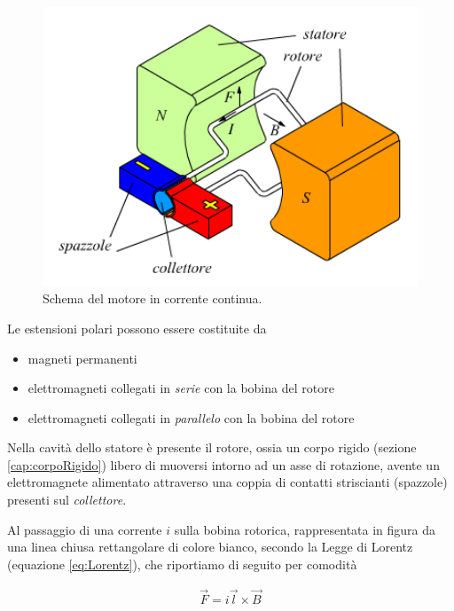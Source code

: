 \documentclass[17pt]{extarticle}
\begin{document}
 \begin{figure}[bh!]		
	\centering
   	\includegraphics[width=4.8in]{motoreCorrenteContinua.png}
  	\caption{Schema del motore in corrente continua.}
   	\label{fig:motoreCorrenteContinua}
\end{figure}


Le estensioni polari possono essere costituite da
\begin{itemize}
	\item magneti permanenti 
	\item elettromagneti collegati in \emph{serie} con la bobina del rotore
	\item elettromagneti collegati in \emph{parallelo} con la bobina del rotore
\end{itemize} 
Nella cavità dello statore è presente il rotore, ossia un corpo rigido (sezione \ref{cap:corpoRigido}) libero di muoversi intorno ad un asse di rotazione, avente un elettromagnete alimentato attraverso una coppia di contatti striscianti (spazzole) presenti sul \emph{collettore}.





Al passaggio di una corrente $i$ sulla bobina rotorica, rappresentata in figura da una linea chiusa rettangolare di colore bianco, secondo la Legge di Lorentz (equazione \ref{eq:Lorentz}), che riportiamo di seguito per comodità


\begin{eqnarray}\nonumber%
	\vec{F} = i\vec{l}\times\vec{B}
\end{eqnarray}
\end{document}
